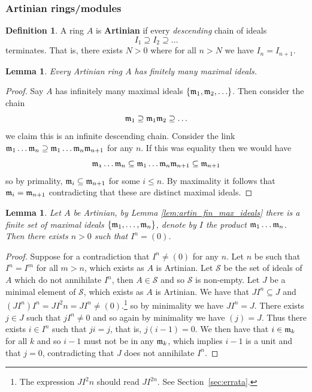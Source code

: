\documentclass[12pt]{article}
\theoremstyle{plain}
\newtheorem{lemma}[thm]{Lemma}
\theoremstyle{definition}
\newtheorem{defn}[thm]{Definition} %
\newcommand{\call}[1]{\mathcal{#1}}
\begin{document}
\subsubsection{Artinian rings/modules}
\begin{defn}
A ring $A$ is \textbf{Artinian} if every \emph{descending} chain of ideals
\[I_1 \supseteq I_2 \supseteq \hdots\]
terminates. That is, there exists $N > 0$ where for all $n > N$ we have $I_n = I_{n+1}$.
\end{defn}
\begin{lemma}
Every Artinian ring $A$ has finitely many maximal ideals.
\end{lemma}
\begin{proof}
\label{lem:artin_fin_max_ideals}
Say $A$ has infinitely many maximal ideals $\lbrace \frak{m}_1,\frak{m}_2,\hdots\rbrace$. Then consider the chain
\[\frak{m}_1 \supseteq \frak{m}_1\frak{m}_2 \supseteq \hdots\]
we claim this is an infinite descending chain. Consider the link $\frak{m}_1\hdots \frak{m}_n \supseteq \frak{m}_1\hdots \frak{m}_n\frak{m}_{n+1}$ for any $n$. If this was equality then we would have
\[\frak{m_1}\hdots \frak{m}_n \subseteq \frak{m}_1\hdots\frak{m}_n\frak{m}_{n+1} \subseteq \frak{m}_{n+1}\]
so by primality, $\frak{m}_i \subseteq \frak{m}_{n+1}$ for some $i \leq n$. By maximality it follows that $\frak{m}_i = \frak{m}_{n+1}$ contradicting that these are distinct maximal ideals.
\end{proof}
\begin{lemma}
Let $A$ be Artinian, by Lemma \ref{lem:artin_fin_max_ideals} there is a finite set of maximal ideals $\lbrace \frak{m}_1,\hdots,\frak{m}_n\rbrace$, denote by $I$ the product $\frak{m}_1\hdots\frak{m}_n$. Then there exists $n > 0$ such that $I^n = (0)$.
\end{lemma}
\begin{proof}
Suppose for a contradiction that $I^n \neq (0)$ for any $n$. Let $n$ be such that $I^n = I^{m}$ for all $m > n$, which exists as $A$ is Artinian. Let $\call{S}$ be the set of ideals of $A$ which do not annihilate $I^n$, then $A \in \call{S}$ and so $\call{S}$ is non-empty. Let $J$ be a minimal element of $\call{S}$, which exists as $A$ is Artinian. We have that $JI^n \subseteq J$ and $(JI^n)I^n = JI^2n = JI^n \neq (0)$.\footnote{The expression $JI^2n$ should read $JI^{2n}$. See Section~\ref{sec:errata}.} so by minimality we have $JI^n = J$. There exists $j \in J$ such that $jI^n \neq 0$ and so again by minimality we have $(j) = J$. Thus there exists $i \in I^n$ such that $ji = j$, that is, $j(i - 1) = 0$. We then have that $i \in \frak{m}_k$ for all $k$ and so $i - 1$ must not be in any $\frak{m}_k$, which implies $i - 1$ is a unit and that $j = 0$, contradicting that $J$ does not annihilate $I^n$.
\end{proof}
\end{document}
